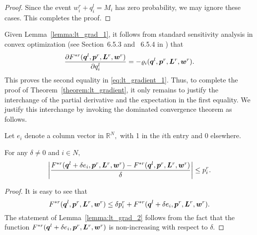 \begin{proof}
Since the event $w^r_i + q^l_i = M_i$ has zero probability, we may
ignore these cases. This completes the proof.
%
%
\end{proof}

Given Lemma~\ref{lemma:lt_grad_1}, it follows from standard
sensitivity analysis in convex optimization (see Section~6.5.3 and
~6.5.4 in \cite{Bertsekas03}) that 
\begin{equation}
  \label{eq:grad_lt}
  \frac{\partial
    F^{*r}(\boldsymbol{q}^l,\boldsymbol{p}^r,\boldsymbol{L}^r,\boldsymbol{w}^r)}
  {\partial q^l_i} =-
  \varrho_i(\boldsymbol{q}^l,\boldsymbol{p}^r,\boldsymbol{L}^r,\boldsymbol{w}^r).  
\end{equation}
This proves the second equality in \eqref{eq:lt_gradient_1}. Thus, to
complete the proof of Theorem~\ref{theorem:lt_gradient}, it only
remains to justify the interchange of the partial derivative and the
expectation in the first equality. We justify this interchange by
invoking the dominated convergence theorem as follows.

Let $e_i$ denote a column vector in $\mathbb{R}^N,$ with 1 in the
$i$th entry and 0 elsewhere.
\begin{lemma}
  \label{lemma:lt_grad_2}
  For any $\delta \neq 0$ and $i \in N,$
  \begin{equation*}
    \left|\frac{F^{*r}(\boldsymbol{q}^l + \delta e_i,\boldsymbol{p}^r,\boldsymbol{L}^r,\boldsymbol{w}^r) - 
        F^{*r}(\boldsymbol{q}^l,\boldsymbol{p}^r,\boldsymbol{L}^r,\boldsymbol{w}^r)}{\delta}\right| \leq p^r_i.
  \end{equation*}  
\end{lemma}
\begin{proof}
  It is easy to see
  that $$F^{*r}(\boldsymbol{q}^l,\boldsymbol{p}^r,\boldsymbol{L}^r,\boldsymbol{w}^r)
  \leq \delta p^r_i + F^{*r}(\boldsymbol{q}^l + \delta
  e_i,\boldsymbol{p}^r,\boldsymbol{L}^r,\boldsymbol{w}^r).$$ The statement of
  Lemma~\ref{lemma:lt_grad_2} follows from the fact that
  the function $F^{*r}(\boldsymbol{q}^l + \delta
  e_i,\boldsymbol{p}^r,\boldsymbol{L}^r,\boldsymbol{w}^r)$ is non-increasing with
  respect to $\delta.$
\end{proof}

